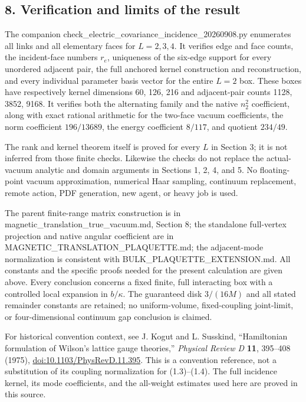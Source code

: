 \documentclass[
  11pt,
]{article}
\begin{document}
\subsection{8. Verification and limits of the
result}\label{magnetic-part-4-verification-and-limits-of-the-result}

The companion check\_electric\_covariance\_incidence\_20260908.py
enumerates all links and all elementary faces for \(L=2,3,4\). It
verifies edge and face counts, the incident-face numbers \(r_e\),
uniqueness of the six-edge support for every unordered adjacent pair,
the full anchored kernel construction and reconstruction, and every
individual parameter basis vector for the entire \(L=2\) box. These
boxes have respectively kernel dimensions 60, 126, 216 and adjacent-pair
counts 1128, 3852, 9168. It verifies both the alternating family and the
native \(n_2^2\) coefficient, along with exact rational arithmetic for
the two-face vacuum coefficients, the norm coefficient \(196/13689\),
the energy coefficient \(8/117\), and quotient \(234/49\).

The rank and kernel theorem itself is proved for every \(L\) in Section
3; it is not inferred from those finite checks. Likewise the checks do
not replace the actual-vacuum analytic and domain arguments in Sections
1, 2, 4, and 5. No floating-point vacuum approximation, numerical Haar
sampling, continuum replacement, remote action, PDF generation, new
agent, or heavy job is used.

The parent finite-range matrix construction is in
magnetic\_translation\_true\_vacuum.md, Section 8; the standalone
full-vertex projection and native angular coefficient are in
MAGNETIC\_TRANSLATION\_PLAQUETTE.md; the adjacent-mode normalization is
consistent with BULK\_PLAQUETTE\_EXTENSION.md. All constants and the
specific proofs needed for the present calculation are given above.
Every conclusion concerns a fixed finite, full interacting box with a
controlled local expansion in \(b/\kappa\). The guaranteed disk
\(3/(16M)\) and all stated remainder constants are retained; no
uniform-volume, fixed-coupling joint-limit, or four-dimensional
continuum gap conclusion is claimed.

For historical convention context, see J. Kogut and L. Susskind,
``Hamiltonian formulation of Wilson's lattice gauge theories,''
\emph{Physical Review D} \textbf{11}, 395--408 (1975),
\href{https://doi.org/10.1103/PhysRevD.11.395}{doi:10.1103/PhysRevD.11.395}.
This is a convention reference, not a substitution of its coupling
normalization for (1.3)--(1.4). The full incidence kernel, its mode
coefficients, and the all-weight estimates used here are proved in this
source.
\end{document}
